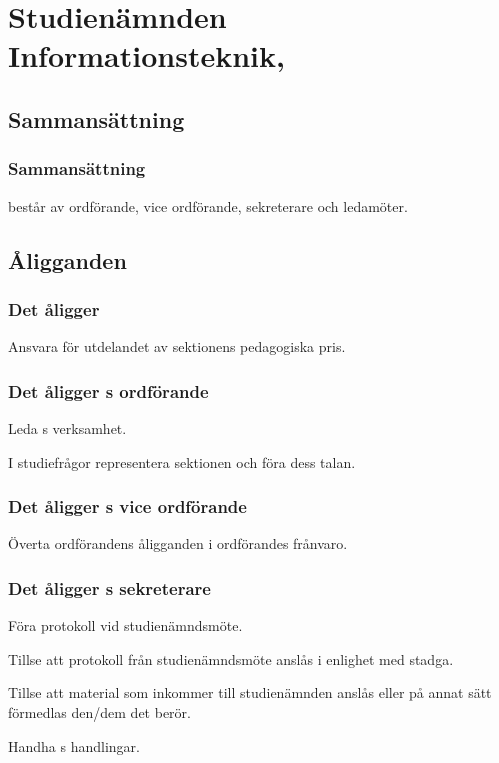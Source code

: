 \section{Studienämnden Informationsteknik, \SNIT}


\subsection{Sammansättning}
  
\subsubsection{Sammansättning}
\SNIT{} består av ordförande, vice ordförande, sekreterare och ledamöter.

\subsection{Åligganden}

\subsubsection{Det åligger \SNIT}

\begin{att}
	\item Ansvara för utdelandet av sektionens pedagogiska pris. 
\end{att}

\subsubsection{Det åligger \SNIT{}s ordförande}
\begin{att}
	\item Leda \SNIT{}s verksamhet.
	\item I studiefrågor representera sektionen och föra dess talan.
\end{att}

\subsubsection{Det åligger \SNIT{}s vice ordförande}
\begin{att}
	\item Överta ordförandens åligganden i ordförandes frånvaro.
\end{att}

\subsubsection{Det åligger \SNIT{}s sekreterare}
\begin{att}
	\item Föra protokoll vid studienämndsmöte.
	\item Tillse att protokoll från studienämndsmöte anslås i enlighet med stadga.
	\item Tillse att material som inkommer till studienämnden anslås eller på annat sätt förmedlas den/dem det berör.
	\item Handha \SNIT{}s handlingar.
\end{att}



